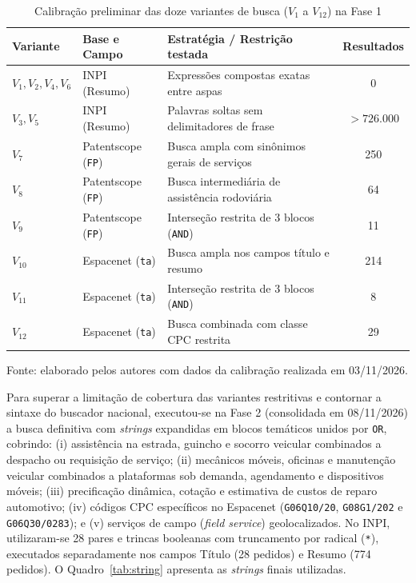 \documentclass[12pt,a4paper]{article}
\begin{document}
\begin{table}[htbp]
\centering\small
\caption{Calibração preliminar das doze variantes de busca ($V_1$ a $V_{12}$) na Fase 1}\label{tab:calibracao}
\begin{tabular}{p{2.3cm}p{2.7cm}p{6.1cm}c}
\toprule
\textbf{Variante} & \textbf{Base e Campo} & \textbf{Estratégia / Restrição testada} & \textbf{Resultados}\\
\midrule
$V_1, V_2, V_4, V_6$ & INPI (Resumo) & Expressões compostas exatas entre aspas & 0\\
$V_3, V_5$ & INPI (Resumo) & Palavras soltas sem delimitadores de frase & $> 726.000$\\
$V_7$ & Patentscope (\texttt{FP}) & Busca ampla com sinônimos gerais de serviços & 250\\
$V_8$ & Patentscope (\texttt{FP}) & Busca intermediária de assistência rodoviária & 64\\
$V_9$ & Patentscope (\texttt{FP}) & Interseção restrita de 3 blocos (\texttt{AND}) & 11\\
$V_{10}$ & Espacenet (\texttt{ta}) & Busca ampla nos campos título e resumo & 214\\
$V_{11}$ & Espacenet (\texttt{ta}) & Interseção restrita de 3 blocos (\texttt{AND}) & 8\\
$V_{12}$ & Espacenet (\texttt{ta}) & Busca combinada com classe CPC restrita & 29\\
\bottomrule
\end{tabular}

\smallskip
\footnotesize Fonte: elaborado pelos autores com dados da calibração realizada em 03/11/2026.
\end{table}

Para superar a limitação de cobertura das variantes restritivas e contornar a sintaxe do buscador nacional, executou-se na Fase 2 (consolidada em 08/11/2026) a busca definitiva com \textit{strings} expandidas em blocos temáticos unidos por \texttt{OR}, cobrindo: (i) assistência na estrada, guincho e socorro veicular combinados a despacho ou requisição de serviço; (ii) mecânicos móveis, oficinas e manutenção veicular combinados a plataformas sob demanda, agendamento e dispositivos móveis; (iii) precificação dinâmica, cotação e estimativa de custos de reparo automotivo; (iv) códigos CPC específicos no Espacenet (\texttt{G06Q10/20}, \texttt{G08G1/202} e \texttt{G06Q30/0283}); e (v) serviços de campo (\textit{field service}) geolocalizados. No INPI, utilizaram-se 28 pares e trincas booleanas com truncamento por radical (\texttt{*}), executados separadamente nos campos Título (28 pedidos) e Resumo (774 pedidos). O Quadro~\ref{tab:string} apresenta as \textit{strings} finais utilizadas.
\end{document}
